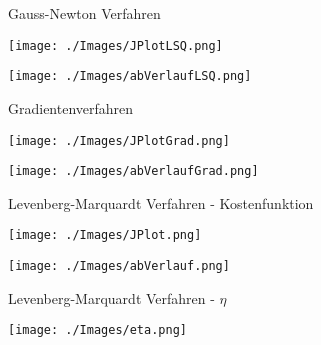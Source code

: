\documentclass[8pt, t, aspectratio=169,%
]{beamer}
\begin{document}
\begin{frame}{Gauss-Newton Verfahren}

\centering
\begin{minipage}{0.5\linewidth}
	\centering
	\texttt{[image: ./Images/JPlotLSQ.png]}
\end{minipage}%
\begin{minipage}{0.5\linewidth}
	\centering
	\texttt{[image: ./Images/abVerlaufLSQ.png]}
\end{minipage}
\end{frame}


\begin{frame}{Gradientenverfahren}

\centering
\begin{minipage}{0.5\linewidth}
	\centering
	\texttt{[image: ./Images/JPlotGrad.png]}
\end{minipage}%
\begin{minipage}{0.5\linewidth}
	\centering
	\texttt{[image: ./Images/abVerlaufGrad.png]}
\end{minipage}
\end{frame}

\begin{frame}{Levenberg-Marquardt Verfahren - Kostenfunktion}

\centering
\begin{minipage}{0.5\linewidth}
	\centering
	\texttt{[image: ./Images/JPlot.png]}
\end{minipage}%
\begin{minipage}{0.5\linewidth}
	\centering
	\texttt{[image: ./Images/abVerlauf.png]}
\end{minipage}
\end{frame}


\begin{frame}{Levenberg-Marquardt Verfahren - $\eta$}

\centering
\begin{minipage}{0.5\linewidth}
	\centering
	\texttt{[image: ./Images/eta.png]}
\end{minipage}%
\end{frame}
\end{document}

